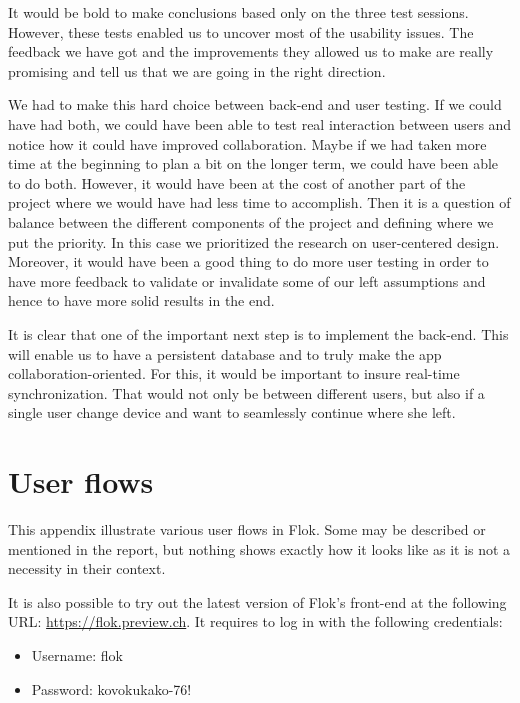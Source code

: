 \documentclass[a4paper,12pt,twoside]{article}
\begin{document}
It would be bold to make conclusions based only on the three test sessions.
However, these tests enabled us to uncover most of the usability issues.
The feedback we have got and the improvements they allowed us to make are really promising and tell us that we are going in the right direction.

We had to make this hard choice between back-end and user testing.
If we could have had both, we could have been able to test real interaction between users and notice how it could have improved collaboration.
Maybe if we had taken more time at the beginning to plan a bit on the longer term, we could have been able to do both.
However, it would have been at the cost of another part of the project where we would have had less time to accomplish.
Then it is a question of balance between the different components of the project and defining where we put the priority.
In this case we prioritized the research on user-centered design.
Moreover, it would have been a good thing to do more user testing in order to have more feedback to validate or invalidate some of our left assumptions and hence to have more solid results in the end.

It is clear that one of the important next step is to implement the back-end.
This will enable us to have a persistent database and to truly make the app collaboration-oriented.
For this, it would be important to insure real-time synchronization.
That would not only be between different users, but also if a single user change device and want to seamlessly continue where she left.

\cleardoublepage



\cleardoublepage
\appendix
\section{User flows}
This appendix illustrate various user flows in Flok.
Some may be described or mentioned in the report, but nothing shows exactly how it looks like as it is not a necessity in their context.

It is also possible to try out the latest version of Flok's front-end at the following URL: \url{https://flok.preview.ch}. It requires to log in with the following credentials:
\begin{itemize}
    \item Username: flok
    \item Password: kovokukako-76!
\end{itemize}
\end{document}
